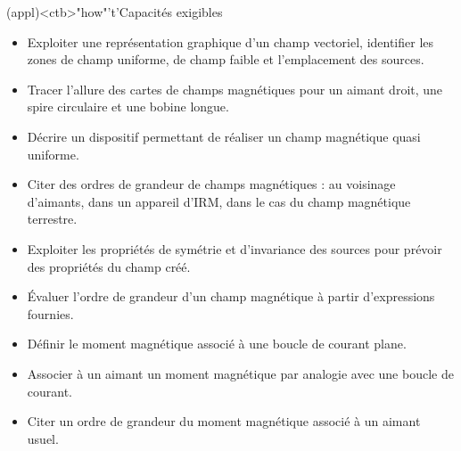 \documentclass[../../main/main.tex]{subfiles}
\begin{document}
\begin{tcn}[sidebyside, fontupper=\small, fontlower=\small](appl)<ctb>"how"'t'{Capacités exigibles}
	\begin{itemize}[label=\rcheck]
		\item Exploiter une représentation graphique d'un champ vectoriel,
		      identifier les zones de champ uniforme, de champ faible et l'emplacement
		      des sources.

		\item Tracer l'allure des cartes de champs magnétiques pour un aimant droit,
		      une spire circulaire et une bobine longue.

		\item Décrire un dispositif permettant de réaliser un champ magnétique quasi
		      uniforme.

		\item Citer des ordres de grandeur de champs magnétiques : au voisinage
		      d'aimants, dans un appareil d'IRM, dans le cas du champ magnétique
		      terrestre.
	\end{itemize}
  \tcblower
	\begin{itemize}[label=\rcheck]
		\item Exploiter les propriétés de symétrie et d'invariance des sources pour
		      prévoir des propriétés du champ créé.

		\item Évaluer l'ordre de grandeur d'un champ magnétique à partir
		      d'expressions fournies.

		\item Définir le moment magnétique associé à une boucle de courant plane.

		\item Associer à un aimant un moment magnétique par analogie avec une boucle
		      de courant.

		\item Citer un ordre de grandeur du moment magnétique associé à un aimant
		      usuel.
	\end{itemize}
\end{tcn}

\vspace*{\fill}

\newpage
\end{document}
